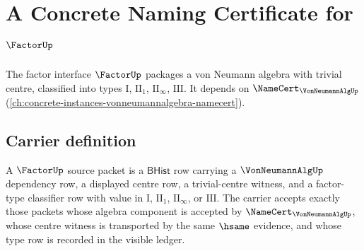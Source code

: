 \chapter{A Concrete Naming Certificate for $\FactorUp$}
\label{ch:concrete-instances-factor-namecert}

The factor interface $\FactorUp$ packages a von Neumann algebra with trivial centre, classified into types $\mathrm{I}$, $\mathrm{II}_1$, $\mathrm{II}_\infty$, $\mathrm{III}$. It depends on $\NameCert_{\VonNeumannAlgUp}$ (\autoref{ch:concrete-instances-vonneumannalgebra-namecert}).

\section{Carrier definition}
\label{sec:factor-carrier}

\begin{definition}
\label{def:factor-bhist-source-packet}
A $\FactorUp$ source packet is a $\mathsf{BHist}$ row carrying a
$\VonNeumannAlgUp$ dependency row, a displayed centre row, a trivial-centre
witness, and a factor-type classifier row with value in
$\mathrm{I}$, $\mathrm{II}_1$, $\mathrm{II}_\infty$, or $\mathrm{III}$. The
carrier accepts exactly those packets whose algebra component is accepted by
$\NameCert_{\VonNeumannAlgUp}$, whose centre witness is transported by the
same $\hsame$ evidence, and whose type row is recorded in the visible ledger.
\end{definition}

